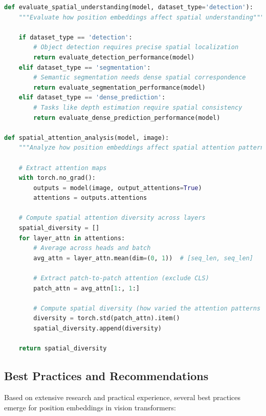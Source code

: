 \begin{lstlisting}[language=Python, caption=Evaluating spatial understanding with different position embeddings]
def evaluate_spatial_understanding(model, dataset_type='detection'):
    """Evaluate how position embeddings affect spatial understanding"""
    
    if dataset_type == 'detection':
        # Object detection requires precise spatial localization
        return evaluate_detection_performance(model)
    elif dataset_type == 'segmentation':
        # Semantic segmentation needs dense spatial correspondence
        return evaluate_segmentation_performance(model)
    elif dataset_type == 'dense_prediction':
        # Tasks like depth estimation require spatial consistency
        return evaluate_dense_prediction_performance(model)

def spatial_attention_analysis(model, image):
    """Analyze how position embeddings affect spatial attention patterns"""
    
    # Extract attention maps
    with torch.no_grad():
        outputs = model(image, output_attentions=True)
        attentions = outputs.attentions
    
    # Compute spatial attention diversity across layers
    spatial_diversity = []
    for layer_attn in attentions:
        # Average across heads and batch
        avg_attn = layer_attn.mean(dim=(0, 1))  # [seq_len, seq_len]
        
        # Extract patch-to-patch attention (exclude CLS)
        patch_attn = avg_attn[1:, 1:]
        
        # Compute spatial diversity (how varied the attention patterns are)
        diversity = torch.std(patch_attn).item()
        spatial_diversity.append(diversity)
    
    return spatial_diversity
\end{lstlisting}

\subsection{Best Practices and Recommendations}

Based on extensive research and practical experience, several best practices emerge for position embeddings in vision transformers:

